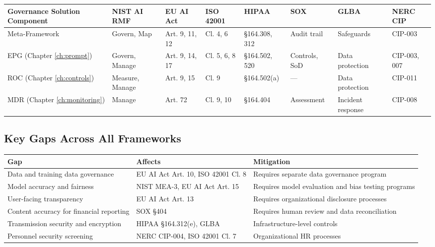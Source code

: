 \begin{table}[ht]
  \centering\scriptsize
  \begin{tabular}{@{}>{\raggedright\arraybackslash}p{2.94cm}>{\raggedright\arraybackslash}p{1.52cm}>{\raggedright\arraybackslash}p{1.42cm}>{\raggedright\arraybackslash}p{1.15cm}>{\raggedright\arraybackslash}p{1.32cm}>{\raggedright\arraybackslash}p{1.32cm}>{\raggedright\arraybackslash}p{1.72cm}>{\raggedright\arraybackslash}p{1.22cm}@{}}
  \toprule
  Governance Solution Component & NIST AI RMF & EU AI Act & ISO 42001 & HIPAA & SOX & GLBA & NERC CIP \\
  \midrule
  Meta-Framework & Govern, Map & Art. 9, 11, 12 & Cl. 4, 6 & \S{}164.308, 312 & Audit trail & Safeguards & CIP-003 \\
  EPG (Chapter \ref{ch:prompt}) & Govern, Manage & Art. 9, 14, 17 & Cl. 5, 6, 8 & \S{}164.502, 520 & Controls, SoD & Data protection & CIP-003, 007 \\
  ROC (Chapter \ref{ch:controls}) & Measure, Manage & Art. 9, 15 & Cl. 9 & \S{}164.502(a) & --- & Data protection & CIP-011 \\
  MDR (Chapter \ref{ch:monitoring}) & Manage & Art. 72 & Cl. 9, 10 & \S{}164.404 & Assessment & Incident response & CIP-008 \\
  \bottomrule
  \end{tabular}
\end{table}


\subsection{Key Gaps Across All Frameworks}


\begin{table}[ht]
  \centering\small
  \begin{tabular}{@{}>{\raggedright\arraybackslash}p{4.59cm}>{\raggedright\arraybackslash}p{3.90cm}>{\raggedright\arraybackslash}p{5.85cm}@{}}
  \toprule
  Gap & Affects & Mitigation \\
  \midrule
  Data and training data governance & EU AI Act Art. 10, ISO 42001 Cl. 8 & Requires separate data governance program \\
  Model accuracy and fairness & NIST MEA-3, EU AI Act Art. 15 & Requires model evaluation and bias testing programs \\
  User-facing transparency & EU AI Act Art. 13 & Requires organizational disclosure processes \\
  Content accuracy for financial reporting & SOX \S{}404 & Requires human review and data reconciliation \\
  Transmission security and encryption & HIPAA \S{}164.312(e), GLBA & Infrastructure-level controls \\
  Personnel security screening & NERC CIP-004, ISO 42001 Cl. 7 & Organizational HR processes \\
  \bottomrule
  \end{tabular}
\end{table}




